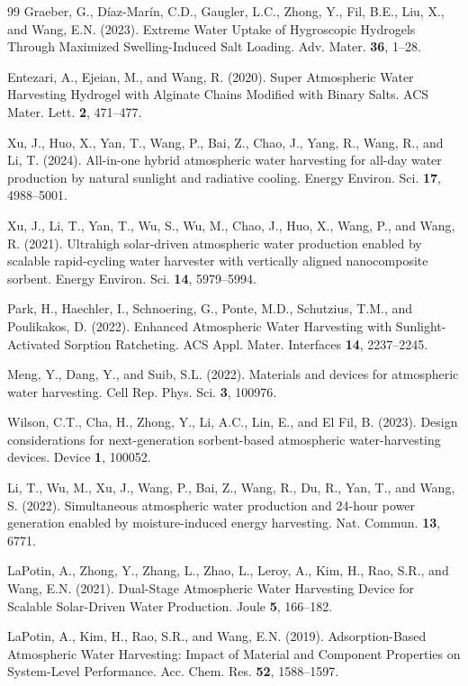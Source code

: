\documentclass[11pt]{article}
\begin{document}
\begin{thebibliography}{99}
 Graeber, G., D{\'i}az-Mar{\'i}n, C.D., Gaugler, L.C., Zhong, Y., Fil, B.E., Liu, X., and Wang, E.N. (2023). Extreme Water Uptake of Hygroscopic Hydrogels Through Maximized Swelling-Induced Salt Loading. Adv. Mater. \textbf{36}, 1--28.

 Entezari, A., Ejeian, M., and Wang, R. (2020). Super Atmospheric Water Harvesting Hydrogel with Alginate Chains Modified with Binary Salts. ACS Mater. Lett. \textbf{2}, 471--477.

 Xu, J., Huo, X., Yan, T., Wang, P., Bai, Z., Chao, J., Yang, R., Wang, R., and Li, T. (2024). All-in-one hybrid atmospheric water harvesting for all-day water production by natural sunlight and radiative cooling. Energy Environ. Sci. \textbf{17}, 4988--5001.

 Xu, J., Li, T., Yan, T., Wu, S., Wu, M., Chao, J., Huo, X., Wang, P., and Wang, R. (2021). Ultrahigh solar-driven atmospheric water production enabled by scalable rapid-cycling water harvester with vertically aligned nanocomposite sorbent. Energy Environ. Sci. \textbf{14}, 5979--5994.

 Park, H., Haechler, I., Schnoering, G., Ponte, M.D., Schutzius, T.M., and Poulikakos, D. (2022). Enhanced Atmospheric Water Harvesting with Sunlight-Activated Sorption Ratcheting. ACS Appl. Mater. Interfaces \textbf{14}, 2237--2245.

 Meng, Y., Dang, Y., and Suib, S.L. (2022). Materials and devices for atmospheric water harvesting. Cell Rep. Phys. Sci. \textbf{3}, 100976.

 Wilson, C.T., Cha, H., Zhong, Y., Li, A.C., Lin, E., and El Fil, B. (2023). Design considerations for next-generation sorbent-based atmospheric water-harvesting devices. Device \textbf{1}, 100052.

 Li, T., Wu, M., Xu, J., Wang, P., Bai, Z., Wang, R., Du, R., Yan, T., and Wang, S. (2022). Simultaneous atmospheric water production and 24-hour power generation enabled by moisture-induced energy harvesting. Nat. Commun. \textbf{13}, 6771.

 LaPotin, A., Zhong, Y., Zhang, L., Zhao, L., Leroy, A., Kim, H., Rao, S.R., and Wang, E.N. (2021). Dual-Stage Atmospheric Water Harvesting Device for Scalable Solar-Driven Water Production. Joule \textbf{5}, 166--182.

 LaPotin, A., Kim, H., Rao, S.R., and Wang, E.N. (2019). Adsorption-Based Atmospheric Water Harvesting: Impact of Material and Component Properties on System-Level Performance. Acc. Chem. Res. \textbf{52}, 1588--1597.


\end{thebibliography}
\end{document}
